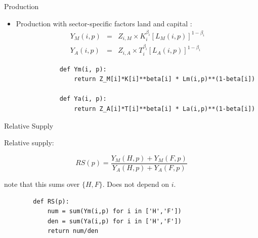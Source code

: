 \documentclass[notes,11pt, aspectratio=169, xcolor=table]{beamer}
\newenvironment{wideitemize}{\itemize\addtolength{\itemsep}{10pt}}{\enditemize}
\begin{document}
\begin{frame}[fragile=singleslide]{Production}

\begin{itemize}
    \item Production with sector-specific factors land  and capital :
        \begin{eqnarray*}\label{eq: production}
            Y_{M}(i,p) &=&  Z_{i,M} \times K_{i}^{\beta_i} [L_{M}(i,p)]^{1-\beta_i}  \\
            Y_{A}(i,p) &=&  Z_{i,A} \times T_{i}^{\beta_i} [L_{A}(i,p)]^{1-\beta_i} 
        \end{eqnarray*}

        \begin{verbatim}
            def Ym(i, p):
                return Z_M[i]*K[i]**beta[i] * Lm(i,p)**(1-beta[i])

            def Ya(i, p):
                return Z_A[i]*T[i]**beta[i] * La(i,p)**(1-beta[i])
        \end{verbatim}
\end{itemize}
    
\end{frame}


\begin{frame}[fragile=singleslide]{Relative Supply}

\begin{wideitemize}
    
    \item Relative supply:

    \begin{equation*}
        RS(p) = \frac{Y_{M}(H,p) + Y_{M}(F,p)}{Y_{A}(H,p) + Y_{A}(F,p)}
    \end{equation*}

    note that this sums over $\{ H, F \}$. Does not depend on $i$.
        \begin{verbatim}
        def RS(p):
            num = sum(Ym(i,p) for i in ['H','F'])
            den = sum(Ya(i,p) for i in ['H','F'])
            return num/den    
        \end{verbatim}
        
    
\end{wideitemize}

    
\end{frame}
\end{document}
